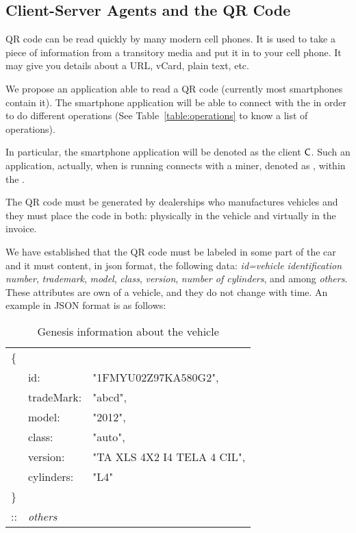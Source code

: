\subsection{Client-Server Agents and the QR Code}
\label{ssec:clientServer}
QR code can be read quickly by many modern cell phones. It is used to take a piece of 
information from a transitory media and put it in to your cell phone. 
It may give you details about a URL, vCard, plain text, etc.

We propose an application able to read a QR code (currently most smartphones contain it).
The smartphone application will be able to connect with the \blockchaincarnetwork in order
to do different operations (See Table~\ref{table:operations} to know a list of operations). 

In particular, the smartphone application will be denoted as the client $\textsf{C}$. Such an application, 
actually, when is running connects with a miner, denoted as \Server, within the \blockchaincarnetwork.


The QR code must be generated by dealerships who manufactures vehicles and they must place the code
in both: physically in the vehicle and virtually in the invoice.

We have established that the QR code must be labeled in some part of the car and it must content,  
in json format, the following data: 
\textit{id=vehicle identification number}, 
\textit{trademark}, 
\textit{model}, 
\textit{class}, 
\textit{version}, 
\textit{number of cylinders}, and
among \textit{others}. These attributes are own of a vehicle, and they do not 
change with time. An example in JSON format is as follows:
\begin{table}[h]
    \centering
    \caption{Genesis information about the vehicle}
    \begin{tabular}{lll}
       \{&         			&    							\\
         & id:        		& "1FMYU02Z97KA580G2", 			\\
         & tradeMark: 		& "abcd", 						\\
         & model:     		& "2012", 						\\
         & class:     		& "auto", 						\\
         & version:   		& "TA XLS 4X2 I4 TELA 4 CIL", 	\\
         & cylinders: 		& "L4" 							\\
       \}& 		        	& 								\\
       ::& \textit{others}	&								\\
    \end{tabular}
    \label{table:genesisInfo}
\end{table}


